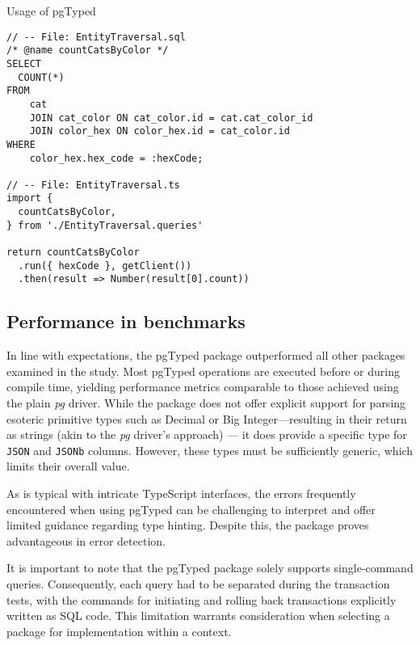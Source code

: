 \begin{listing}
\caption{Usage of pgTyped}
\label{lst:pgTyped}
\begin{verbatim}
// -- File: EntityTraversal.sql
/* @name countCatsByColor */
SELECT
  COUNT(*)
FROM
    cat
    JOIN cat_color ON cat_color.id = cat.cat_color_id
    JOIN color_hex ON color_hex.id = cat_color.id
WHERE
    color_hex.hex_code = :hexCode;

// -- File: EntityTraversal.ts 
import {
  countCatsByColor,
} from './EntityTraversal.queries'

return countCatsByColor
  .run({ hexCode }, getClient())
  .then(result => Number(result[0].count))

\end{verbatim}
\end{listing}
\subsection*{Performance in benchmarks}
In line with expectations, the pgTyped package outperformed all other packages
examined in the study. Most pgTyped operations are executed before or during
compile time, yielding performance metrics comparable to those achieved using
the plain \textit{pg} driver. While the package does not offer explicit support for
parsing esoteric primitive types such as Decimal or Big Integer—resulting in
their return as strings (akin to the \textit{pg} driver's approach) — it does provide a
specific type for \texttt{JSON} and \texttt{JSONb} columns. However, these types
must be sufficiently generic, which limits their overall value.

As is typical with intricate TypeScript interfaces, the errors frequently
encountered when using pgTyped can be challenging to interpret and offer
limited guidance regarding type hinting. Despite this, the package proves
advantageous in error detection.

It is important to note that the pgTyped package solely supports
single-command queries. Consequently, each query had to be separated during the
transaction tests, with the commands for initiating and rolling back
transactions explicitly written as SQL code. This limitation warrants
consideration when selecting a package for implementation within a context.
